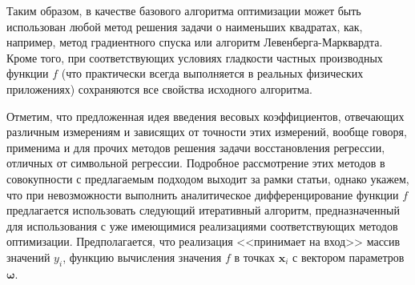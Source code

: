 \documentclass[tikz,10pt,a4paper]{article}
\newcommand{\bomega}{\boldsymbol{\omega}}
\begin{document}

Таким образом, в качестве базового алгоритма оптимизации может
быть использован любой метод решения задачи о наименьших квадратах, как, например,
метод градиентного спуска или алгоритм Левенберга-Марквардта\cite{dlib09}. Кроме того, при
соответствующих условиях гладкости частных производных функции $f$ (что практически
всегда выполняется в реальных физических приложениях) сохраняются все свойства
исходного алгоритма.

Отметим, что предложенная идея введения весовых коэффициентов, отвечающих различным
измерениям и зависящих от точности этих измерений, вообще говоря, применима и для
прочих методов решения задачи восстановления регрессии, отличных от символьной регрессии.
Подробное рассмотрение этих методов в совокупности с предлагаемым подходом выходит за рамки
статьи, однако укажем, что при невозможности выполнить аналитическое
дифференцирование функции $f$ предлагается использовать следующий
итеративный алгоритм, предназначенный для использования с уже имеющимися
реализациями соответствующих методов оптимизации. Предполагается, что реализация
<<принимает на вход>> массив значений $y_i$,
функцию вычисления значения $f$ в точках $\mathbf{x}_i$ с вектором параметров $\bomega$.
\end{document}
